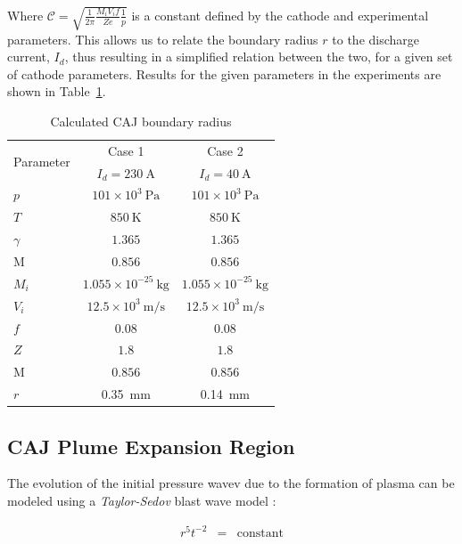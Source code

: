 \documentclass[a4paper]{iacas}%
\begin{document}
Where $\mathcal{C} = \sqrt{\frac{1}{2\pi}\frac{M_i V_i f}{Z e}\frac{1}{p}}$ is a constant defined by the cathode and experimental parameters. This allows us to relate the boundary radius $r$ to the discharge current, $I_d$, thus resulting in a simplified relation between the two, for a given set of cathode parameters. Results for the given parameters in the experiments \cite{KR,KRClose} are shown in Table~\ref{t:radii}.

\begin{table}[hbt]
	\begin{center}
		\begin{threeparttable}
			\caption{Calculated CAJ boundary radius}
			\label{t:radii}
			\begin{tabular}{l|c|c}
				\multirow{2}{*}{Parameter} & Case 1 & Case 2\\ 
				& $I_d = 230~\mathrm{A}$ & $I_d = 40~\mathrm{A}$\\\hline
				$p$ & $101 \times 10^3~\mathrm{Pa} $ & $101 \times 10^3~\mathrm{Pa} $ \\
				$T$	& $850~\mathrm{K}$ & $850~\mathrm{K}$ \\
				$\gamma$ & $1.365$ & $1.365$ \\ 
				$\mathrm{M}$	& $0.856$ & $0.856$ \\
				$M_i$  	& $1.055 \times 10^{-25}~\mathrm{kg} $ & $1.055 \times 10^{-25}~\mathrm{kg} $  \\
				$V_i$ 	& $12.5 \times 10^3~\mathrm{m/s} $ & $12.5 \times 10^3~\mathrm{m/s} $  \\
				$f$ 	& $0.08 $ & $0.08 $ \\
				$Z$	& $1.8 $ & $1.8 $ \\
				$\mathrm{M}$	& $0.856$ & $0.856$ \\
				$r$ 	& 0.35~mm & 0.14~mm
			\end{tabular}
		\end{threeparttable}
	\end{center}
\end{table} 

\subsection{CAJ Plume Expansion Region}\label{subs:CAJ_expansion}

The evolution of the initial pressure wavev due to the formation of plasma can be modeled using a \emph{Taylor-Sedov} blast wave model \cite{TAYLOR,SEDOV}: 

\begin{eqnarray}\label{eqn:taylor_sedov}
r^5 t^{-2} &=& \mathrm{constant}
\end{eqnarray}
\end{document}
